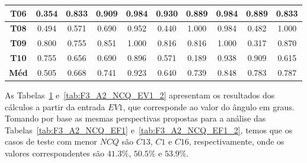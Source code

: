 \begin{table}[htbp]
\begin{tabular}{|c|ccccccccc|}
		\textbf{T06} & \multicolumn{1}{c|}{0.354} & \multicolumn{1}{c|}{0.833} & \multicolumn{1}{c|}{0.909} & \multicolumn{1}{c|}{0.984} & \multicolumn{1}{c|}{0.930} & \multicolumn{1}{c|}{0.889} & \multicolumn{1}{c|}{0.984} & \multicolumn{1}{c|}{0.889} & 0.833 \\ \hline
		\rowcolor[HTML]{F2F2F2} 
		\textbf{T08} & \multicolumn{1}{c|}{\cellcolor[HTML]{F2F2F2}0.494} & \multicolumn{1}{c|}{\cellcolor[HTML]{F2F2F2}0.571} & \multicolumn{1}{c|}{\cellcolor[HTML]{F2F2F2}0.690} & \multicolumn{1}{c|}{\cellcolor[HTML]{F2F2F2}0.952} & \multicolumn{1}{c|}{\cellcolor[HTML]{F2F2F2}0.440} & \multicolumn{1}{c|}{\cellcolor[HTML]{F2F2F2}1.000} & \multicolumn{1}{c|}{\cellcolor[HTML]{F2F2F2}0.984} & \multicolumn{1}{c|}{\cellcolor[HTML]{F2F2F2}0.482} & 1.000 \\ \hline
		\textbf{T09} & \multicolumn{1}{c|}{0.800} & \multicolumn{1}{c|}{0.755} & \multicolumn{1}{c|}{0.851} & \multicolumn{1}{c|}{1.000} & \multicolumn{1}{c|}{0.816} & \multicolumn{1}{c|}{0.816} & \multicolumn{1}{c|}{1.000} & \multicolumn{1}{c|}{0.317} & 0.870 \\ \hline
		\rowcolor[HTML]{F2F2F2} 
		\textbf{T10} & \multicolumn{1}{c|}{\cellcolor[HTML]{F2F2F2}0.755} & \multicolumn{1}{c|}{\cellcolor[HTML]{F2F2F2}0.656} & \multicolumn{1}{c|}{\cellcolor[HTML]{F2F2F2}0.690} & \multicolumn{1}{c|}{\cellcolor[HTML]{F2F2F2}0.896} & \multicolumn{1}{c|}{\cellcolor[HTML]{F2F2F2}0.571} & \multicolumn{1}{c|}{\cellcolor[HTML]{F2F2F2}0.189} & \multicolumn{1}{c|}{\cellcolor[HTML]{F2F2F2}0.938} & \multicolumn{1}{c|}{\cellcolor[HTML]{F2F2F2}0.909} & 0.615 \\ \hline
		\cellcolor[HTML]{F2F2F2}\textbf{Méd} & \multicolumn{1}{c|}{0.505} & \multicolumn{1}{c|}{0.668} & \multicolumn{1}{c|}{0.741} & \multicolumn{1}{c|}{0.923} & \multicolumn{1}{c|}{0.640} & \multicolumn{1}{c|}{0.739} & \multicolumn{1}{c|}{0.848} & \multicolumn{1}{c|}{0.783} & 0.787 \\ \hline
	\end{tabular}
	\label{tab:F3_A2_NCQ_EV1}
\end{table}

As Tabelas~\ref{tab:F3_A2_NCQ_EV1} e~\ref{tab:F3_A2_NCQ_EV1_2} apresentam os resultados dos cálculos a partir da entrada $EV1$, que corresponde ao valor do ângulo em graus. Tomando por base as mesmas perspectivas propostas para a análise das Tabelas~\ref{tab:F3_A2_NCQ_EF1} e~\ref{tab:F3_A2_NCQ_EF1_2}, temos que os casos de teste com menor $NCQ$ são $C13$, $C1$ e $C16$, respectivamente, onde os valores correspondentes são $41.3\%$, $50.5\%$ e $53.9\%$.


